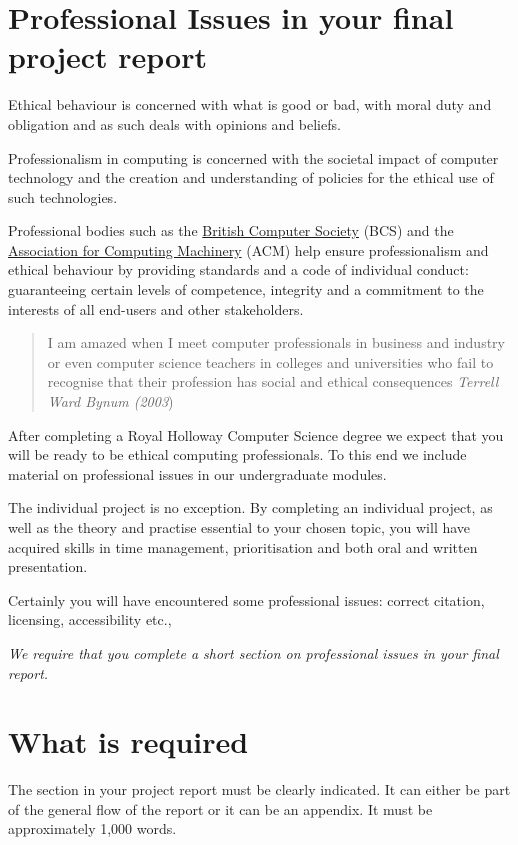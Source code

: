 \documentclass[11pt]{article}
\newcommand{\profIssuesLength}{1,000 }
\begin{document}
\newpage
\section{Professional Issues in your final project report}
\label{sec:professionalIssues}

Ethical behaviour is concerned with what is good or bad, with moral duty and obligation and as such deals with opinions and beliefs.

Professionalism in computing is concerned with the societal impact of computer technology and the creation and understanding of policies for the ethical use of such technologies.

Professional bodies such as the \href{http://www.bcs.org/category/6030}{British Computer Society} (BCS) and the \href{http://www.acm.org/about/code-of-ethics}{Association for Computing Machinery} (ACM) help ensure professionalism and ethical behaviour by providing  standards and a code of individual conduct: guaranteeing certain levels of competence, integrity and a commitment to the interests of all end-users and other stakeholders.

\begin{quote}
I am amazed when I meet computer professionals in business and industry or even computer science teachers in colleges and universities who fail to recognise that their profession has social and ethical consequences
        \textit{Terrell Ward Bynum (2003})
        \end{quote}

After completing a Royal Holloway Computer Science degree we expect that you will be ready to be ethical computing professionals.  To this end we include material on professional issues in our undergraduate modules.

The individual project is no exception.   By completing an individual project, as well as the theory and practise essential to your chosen topic,  you will have acquired skills in time management, prioritisation and both oral and written presentation.

Certainly you will have encountered some professional issues: correct citation, licensing, accessibility etc.,

\textit{We require that you complete a short section on professional issues in your final report.}

\section*{What is required}
The section in your project report must be clearly indicated.  It can either be part of the general flow of the report or it can be an appendix.  It must be approximately \profIssuesLength words.
\end{document}
